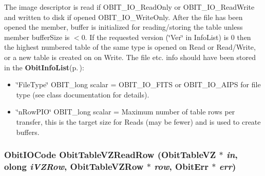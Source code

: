 The image descriptor is read if OBIT\_\-IO\_\-Read\-Only or OBIT\_\-IO\_\-Read\-Write and written to disk if opened OBIT\_\-IO\_\-Write\-Only. After the file has been opened the member, buffer is initialized for reading/storing the table unless member buffer\-Size is $<$0. If the requested version (\char`\"{}Ver\char`\"{} in Info\-List) is 0 then the highest numbered table of the same type is opened on Read or Read/Write, or a new table is created on on Write. The file etc. info should have been stored in the {\bf Obit\-Info\-List}{\rm (p.\,\pageref{structObitInfoList})}: \begin{itemize}
\item \char`\"{}File\-Type\char`\"{} OBIT\_\-long scalar = OBIT\_\-IO\_\-FITS or OBIT\_\-IO\_\-AIPS for file type (see class documentation for details). \item \char`\"{}n\-Row\-PIO\char`\"{} OBIT\_\-long scalar = Maximum number of table rows per transfer, this is the target size for Reads (may be fewer) and is used to create buffers. 
\end{itemize}
\subsubsection{\setlength{\rightskip}{0pt plus 5cm}Obit\-IOCode Obit\-Table\-VZRead\-Row ({\bf Obit\-Table\-VZ} $\ast$ {\em in}, {\bf olong} {\em i\-VZRow}, {\bf Obit\-Table\-VZRow} $\ast$ {\em row}, {\bf Obit\-Err} $\ast$ {\em err})}\label{ObitTableVZ_8c_a22}


